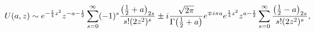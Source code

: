 \[\mathop{U\/}\nolimits\!\left(a,z\right)\sim e^{-\frac{1}{4}z^{2}}z^{-a-\frac{1%
}{2}}\sum_{s=0}^{\infty}(-1)^{s}\frac{\left(\frac{1}{2}+a\right)_{2s}}{s!(2z^{%
2})^{s}}\pm i\frac{\sqrt{2\pi}}{\mathop{\Gamma\/}\nolimits\!\left(\tfrac{1}{2}%
+a\right)}e^{\mp i\pi a}e^{\frac{1}{4}z^{2}}z^{a-\frac{1}{2}}\sum_{s=0}^{%
\infty}\frac{\left(\tfrac{1}{2}-a\right)_{2s}}{s!(2z^{2})^{s}},\]